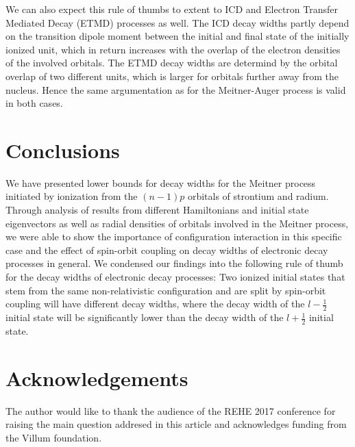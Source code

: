 \documentclass[aps,amssymb,preprint,a4paper]{revtex4}
\begin{document}
We can also expect this rule of thumbs to extent to ICD and
Electron Transfer Mediated Decay (ETMD) processes as well. The ICD
decay widths partly depend on the transition dipole moment between the
initial and final state of the initially ionized unit, which in return increases
with the overlap of the electron densities of the involved orbitals.
The ETMD decay widths are determind by the orbital overlap of two different units,
which is larger for orbitals further away from the nucleus.
Hence the same argumentation as for the Meitner-Auger process is valid in both
cases.




%
\section{Conclusions}
\label{section:conclusions}

We have presented lower bounds for
decay widths for the Meitner process initiated by
ionization from the $(n-1)p$ orbitals of strontium and radium.
Through analysis of results from different Hamiltonians and initial state
eigenvectors as well as radial densities of orbitals involved in the
Meitner process, we were able to show the importance of configuration interaction
in this specific case and the effect of spin-orbit coupling on decay widths
of electronic decay processes in general.
We condensed our findings into the following rule of thumb for the decay widths
of electronic decay processes:
Two ionized initial states that stem from the same non-relativistic configuration and
are split by spin-orbit coupling will have different decay widths, where the decay width
of the $l-\frac12$ initial state will be significantly lower than the decay width of
the $l + \frac12$ initial state.

%
\section{Acknowledgements}
The author would like to thank the audience of the REHE 2017 conference for
raising the main question addresed in this article
and acknowledges funding from the Villum foundation.

\clearpage



\end{document}
